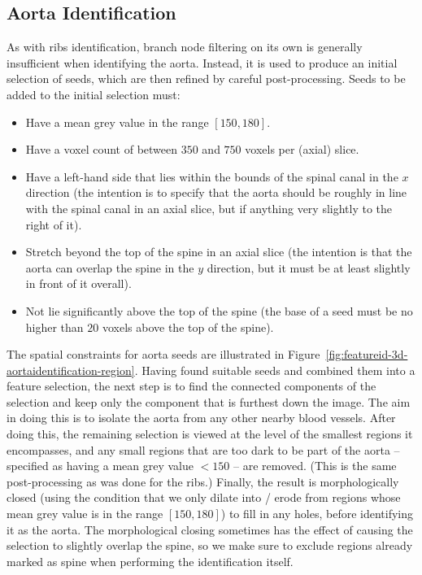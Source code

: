 \afterpage{\clearpage}
\newpage

\subsection{Aorta Identification}


\noindent As with ribs identification, branch node filtering on its own is generally insufficient when identifying the aorta. Instead, it is used to produce an initial selection of seeds, which are then refined by careful post-processing. Seeds to be added to the initial selection must:
%
\begin{itemize}
\item Have a mean grey value in the range $[150,180]$.
\item Have a voxel count of between $350$ and $750$ voxels per (axial) slice.
\item Have a left-hand side that lies within the bounds of the spinal canal in the $x$ direction (the intention is to specify that the aorta should be roughly in line with the spinal canal in an axial slice, but if anything very slightly to the right of it).
\item Stretch beyond the top of the spine in an axial slice (the intention is that the aorta can overlap the spine in the $y$ direction, but it must be at least slightly in front of it overall).
\item Not lie significantly above the top of the spine (the base of a seed must be no higher than $20$ voxels above the top of the spine).
\end{itemize}
%
The spatial constraints for aorta seeds are illustrated in Figure~\ref{fig:featureid-3d-aortaidentification-region}. Having found suitable seeds and combined them into a feature selection, the next step is to find the connected components of the selection and keep only the component that is furthest down the image. The aim in doing this is to isolate the aorta from any other nearby blood vessels. After doing this, the remaining selection is viewed at the level of the smallest regions it encompasses, and any small regions that are too dark to be part of the aorta -- specified as having a mean grey value $< 150$ -- are removed. (This is the same post-processing as was done for the ribs.) Finally, the result is morphologically closed (using the condition that we only dilate into / erode from regions whose mean grey value is in the range $[150,180]$) to fill in any holes, before identifying it as the aorta. The morphological closing sometimes has the effect of causing the selection to slightly overlap the spine, so we make sure to exclude regions already marked as spine when performing the identification itself.

